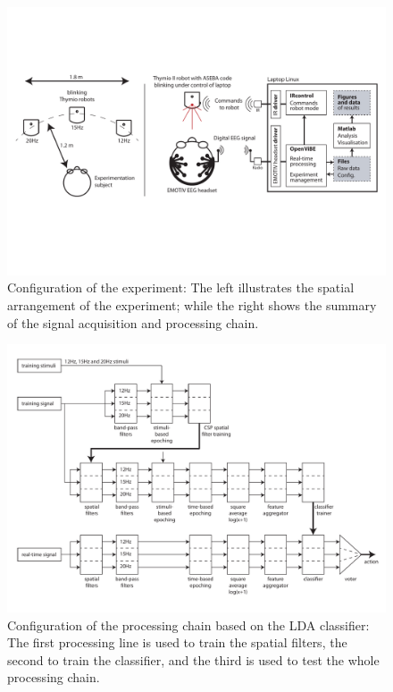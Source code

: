\documentclass[smallextended]{svjour3}
\begin{document}
\begin{figure}
\center
\includegraphics[width=\textwidth]{figures/schema-global.pdf}
\caption{Configuration of the experiment: The left illustrates the spatial arrangement of the experiment; while the right shows the summary of the signal acquisition and processing chain.} \label{fig:thymioinstall}
\end{figure}

\begin{figure}
\center
\includegraphics[width=\textwidth]{figures/schema-openvibe.pdf}
\caption{Configuration of the processing chain based on the LDA classifier: The first processing line is used to train the spatial filters, the second to train the classifier, and the third is used to test the whole processing chain.} \label{fig:LDA}
\end{figure}
\end{document}
